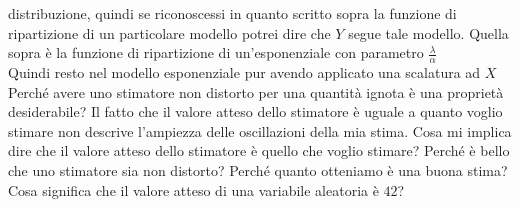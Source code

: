 \documentclass{article}
\begin{document}
    distribuzione, quindi se riconoscessi in quanto scritto sopra la funzione di ripartizione di un particolare modello potrei dire che $ Y $ segue tale modello. Quella sopra
    è la funzione di ripartizione di un'esponenziale con parametro $ \frac{ \lambda }{ \alpha } $ \\
    Quindi resto nel modello esponenziale pur avendo applicato una scalatura ad $ X $ \\
    Perché avere uno stimatore non distorto per una quantità ignota è una proprietà desiderabile? Il fatto che il valore atteso dello stimatore è uguale a quanto voglio
    stimare non descrive l'ampiezza delle oscillazioni della mia stima. Cosa mi implica dire che il valore atteso dello stimatore è quello che voglio stimare? Perché è bello
    che uno stimatore sia non distorto? Perché quanto otteniamo è una buona stima? Cosa significa che il valore atteso di una variabile aleatoria è $ 42 $? \\
    
\end{document}
